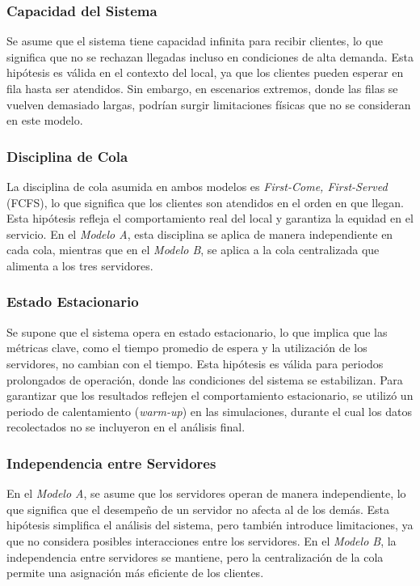\documentclass[a4paper,12pt]{article}
\begin{document}
\subsubsection{Capacidad del Sistema}

Se asume que el sistema tiene capacidad infinita para recibir clientes, lo que significa que no se rechazan llegadas incluso en condiciones de alta demanda. Esta hipótesis es válida en el contexto del local, ya que los clientes pueden esperar en fila hasta ser atendidos. Sin embargo, en escenarios extremos, donde las filas se vuelven demasiado largas, podrían surgir limitaciones físicas que no se consideran en este modelo.

\subsubsection{Disciplina de Cola}

La disciplina de cola asumida en ambos modelos es \textit{First-Come, First-Served} (FCFS), lo que significa que los clientes son atendidos en el orden en que llegan. Esta hipótesis refleja el comportamiento real del local y garantiza la equidad en el servicio. En el \textit{Modelo A}, esta disciplina se aplica de manera independiente en cada cola, mientras que en el \textit{Modelo B}, se aplica a la cola centralizada que alimenta a los tres servidores.

\subsubsection{Estado Estacionario}

Se supone que el sistema opera en estado estacionario, lo que implica que las métricas clave, como el tiempo promedio de espera y la utilización de los servidores, no cambian con el tiempo. Esta hipótesis es válida para periodos prolongados de operación, donde las condiciones del sistema se estabilizan. Para garantizar que los resultados reflejen el comportamiento estacionario, se utilizó un periodo de calentamiento (\textit{warm-up}) en las simulaciones, durante el cual los datos recolectados no se incluyeron en el análisis final.

\subsubsection{Independencia entre Servidores}

En el \textit{Modelo A}, se asume que los servidores operan de manera independiente, lo que significa que el desempeño de un servidor no afecta al de los demás. Esta hipótesis simplifica el análisis del sistema, pero también introduce limitaciones, ya que no considera posibles interacciones entre los servidores. En el \textit{Modelo B}, la independencia entre servidores se mantiene, pero la centralización de la cola permite una asignación más eficiente de los clientes.
\end{document}
